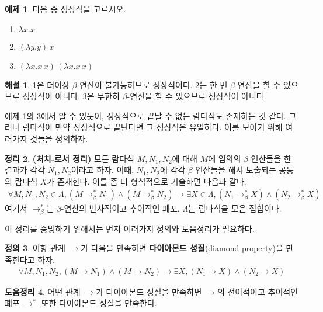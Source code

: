 \documentclass[b5paper, 11pt]{book}
\theoremstyle{definition}
\newtheorem{defn}{정의}[chapter]
\newtheorem{thm}[defn]{정리}
\newtheorem{ex}[defn]{예제}
\newtheorem{lem}[defn]{도움정리}
\newtheorem*{ans*}{해설}
\begin{document}
\begin{ex}
    \label{normal form ex}
    다음 중 정상식을 고르시오.
    \begin{enumerate}
        \item $\lambda x. x$
        \item $(\lambda y. y) \, x$
        \item $(\lambda x.x \, x) \, (\lambda x. x \, x)$
    \end{enumerate}
\end{ex}
\begin{ans*}
    1은 더이상 $\beta$-연산이 불가능하므로 정상식이다. 2는 한 번 $\beta$-연산을 할 수 있으므로 정상식이 아니다. 3은 무한히 $\beta$-연산을 할 수 있으므로 정상식이 아니다.
\end{ans*}
예제 \ref{normal form ex}의 3에서 알 수 있듯이, 정상식으로 끝날 수 없는 람다식도 존재하는 것 같다. 그러나 람다식이 만약 정상식으로 끝난다면 그 정상식은 유일하다. 이를 보이기 위해 여러가지 것들을 정의하자.
\begin{thm} \label{church-rosser}
    \textbf{(처치-로서 정리)} 모든 람다식 $M, N_1, N_2$에 대해 $M$에  임의의 $\beta$-연산들을 한 결과가 각각 $N_1, N_2$이라고 하자. 이때, $N_1, N_2$에 각각 $\beta$-연산들을 해서 도출되는 공통의 람다식 $X$가 존재한다. 이를 좀 더 형식적으로 기술하면 다음과 같다.
    \begin{align*}
        \forall M, N_1, N_2 \in \Lambda, (M \rightarrow_\beta^* N_1) \wedge (M \rightarrow_\beta^* N_2) \rightarrow \exists X \in \Lambda, (N_1 \rightarrow_\beta^* X) \wedge (N_2 \rightarrow_\beta^* X)
    \end{align*}
    여기서 $\rightarrow_\beta^*$는 $\beta$-연산의 반사적이고 추이적인 폐포, $\Lambda$는 람다식을 모은 집합이다.
\end{thm}
이 정리를 증명하기 위해서는 먼저 여러가지 정의와 도윰정리가 필요하다.
\begin{defn}
    이항 관계 $\rightarrow$가 다음을 만족하면 \textbf{다이아몬드 성질}(diamond property)을 만족한다고 하자.
    \begin{align*}
        \forall M, N_1, N_2, (M \rightarrow N_1) \wedge (M \rightarrow N_2) \rightarrow \exists X, (N_1 \rightarrow X) \wedge (N_2 \rightarrow X)
    \end{align*}
\end{defn}
\begin{lem} \label{diamond property lemma}
    어떤 관계 $\rightarrow$가 다이아몬드 성질을 만족하면 $\rightarrow$의 전이적이고 추이적인 폐포 $\rightarrow^*$ 또한 다이아몬드 성질을 만족한다.
\end{lem}
\end{document}
